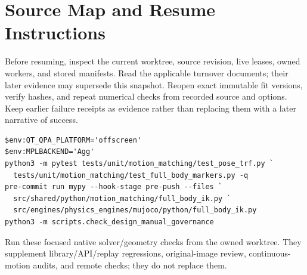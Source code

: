\documentclass[11pt,letterpaper]{article}
\renewcommand{\arraystretch}{1.16}
\begin{document}
\section{Source Map and Resume Instructions}
{\footnotesize
\setlength{\parskip}{3pt}
\renewcommand{\arraystretch}{1.05}
Before resuming, inspect the current worktree, source revision, live leases,
owned workers, and stored manifests. Read the applicable turnover documents;
their later evidence may supersede this snapshot. Reopen exact immutable fit
versions, verify hashes, and repeat numerical checks from recorded source and
options. Keep earlier failure receipts as evidence rather than replacing them
with a later narrative of success.

\begin{verbatim}
$env:QT_QPA_PLATFORM='offscreen'
$env:MPLBACKEND='Agg'
python3 -m pytest tests/unit/motion_matching/test_pose_trf.py `
  tests/unit/motion_matching/test_full_body_markers.py -q
pre-commit run mypy --hook-stage pre-push --files `
  src/shared/python/motion_matching/full_body_ik.py `
  src/engines/physics_engines/mujoco/python/full_body_ik.py
python3 -m scripts.check_design_manual_governance
\end{verbatim}
Run these focused native solver/geometry checks from the owned worktree.
They supplement library/API/replay regressions, original-image review,
continuous-motion audits, and remote checks; they do not replace them.

}
\end{document}
